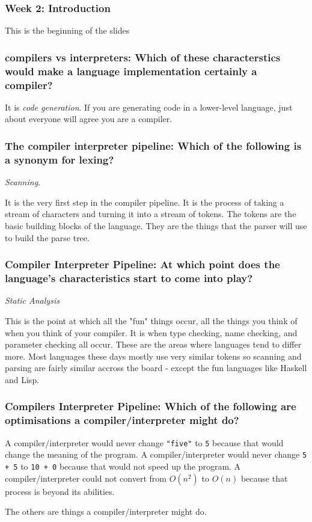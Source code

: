 \documentclass[11pt]{beamer}
\begin{document}
\begin{frame}
\frametitle{Week 2: Introduction}
This is the beginning of the slides
\end{frame}

\begin{frame}
\frametitle{compilers vs interpreters: Which of these characterstics would make a language implementation certainly a compiler?}
It is \emph{code generation}.  If you are generating code in a lower-level language, just about everyone will agree you are a compiler.
\end{frame}

\begin{frame}
\frametitle{The compiler interpreter pipeline: Which of the following is a synonym for lexing?}
\emph{Scanning}.

It is the very first step in the compiler pipeline. It is the process of taking a stream of characters and turning it into a stream of tokens. The tokens are the basic building blocks of the language. They are the things that the parser will use to build the parse tree.
\end{frame}

\begin{frame}
\frametitle{Compiler Interpreter Pipeline: At which point does the language's characteristics start to come into play?}
\emph{Static Analysis}

This is the point at which all the "fun" things occur, all the things you think of when you think of your compiler.  It is when type checking, name checking, and parameter checking all occur.  These are the areas where languages tend to differ more.  Most languages these days mostly use very similar tokens so scanning and parsing are fairly similar accross the board - except the fun languages like Haskell and Lisp.
\end{frame}


\begin{frame}[fragile=singleslide]
\frametitle{Compilers Interpreter Pipeline: Which of the following are optimisations a compiler/interpreter might do?}
A compiler/interpreter would never change \verb|"five"| to \verb|5| because that would change the meaning of the program.  A compiler/interpreter would never change \verb|5 + 5| to \verb|10 + 0| because that would not speed up the program.  A compiler/interpreter could not convert from $O(n^2)$ to $O(n)$ because that process is beyond its abilities.

The others are things a compiler/interpreter might do.
\end{frame}
\end{document}
